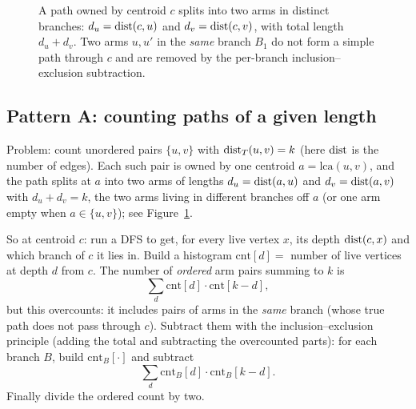 \begin{figure}[H]
\centering
{}
\caption{A path owned by centroid $c$ splits into two arms in distinct branches:
$d_u=\operatorname{dist}(c,u)$ and $d_v=\operatorname{dist}(c,v)$, with total length $d_u+d_v$. Two arms $u,u'$ in
the \emph{same} branch $B_1$ do not form a simple path through $c$ and are removed by the
per-branch inclusion--exclusion subtraction.}
\label{ch20:fig-arms}
\end{figure}

\subsection{Pattern A: counting paths of a given length}

Problem: count unordered pairs $\{u,v\}$ with $\operatorname{dist}_T(u,v)=k$ (here $\operatorname{dist}$ is the
number of edges). Each such pair is owned by one centroid $a=\mathrm{lca}(u,v)$,
and the path splits at $a$ into two arms of lengths $d_u=\operatorname{dist}(a,u)$ and
$d_v=\operatorname{dist}(a,v)$ with $d_u+d_v=k$, the two arms living in different branches off
$a$ (or one arm empty when $a\in\{u,v\}$); see Figure~\ref{ch20:fig-arms}.

So at centroid $c$: run a DFS to get, for every live vertex $x$, its depth
$\operatorname{dist}(c,x)$ and which branch of $c$ it lies in. Build a histogram
$\mathrm{cnt}[d]=$ number of live vertices at depth $d$ from $c$. The number of
\emph{ordered} arm pairs summing to $k$ is
\[
  \sum_{d} \mathrm{cnt}[d]\cdot \mathrm{cnt}[k-d],
\]
but this overcounts: it includes pairs of arms in the
\emph{same} branch (whose true path does not pass through $c$). Subtract them with
the inclusion--exclusion principle (adding the total and subtracting the overcounted parts): for each branch $B$, build $\mathrm{cnt}_B[\cdot]$
and subtract
\[
  \sum_d \mathrm{cnt}_B[d]\cdot\mathrm{cnt}_B[k-d].
\]
Finally divide the
ordered count by two.

